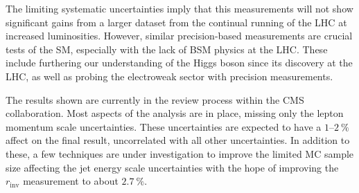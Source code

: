 The limiting systematic uncertainties imply that this measurements will not show significant gains from a larger dataset from the continual running of the LHC at increased luminosities. However, similar precision-based measurements are crucial tests of the SM, especially with the lack of BSM physics at the LHC.  These include furthering our understanding of the Higgs boson since its discovery at the LHC, as well as probing the electroweak sector with precision measurements.

The results shown are currently in the review process within the CMS collaboration. Most aspects of the analysis are in place, missing only the lepton momentum scale uncertainties. These uncertainties are expected to have a $1$--$\SI{2}{\%}$ affect on the final result, uncorrelated with all other uncertainties. In addition to these, a few techniques are under investigation to improve the limited MC sample size affecting the jet energy scale uncertainties with the hope of improving the $r_{\mathrm{inv}}$ measurement to about $\SI{2.7}{\%}$.